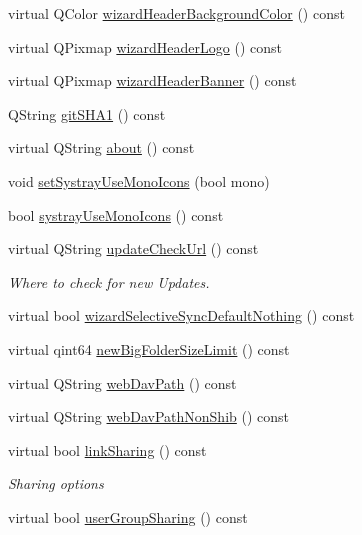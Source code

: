 \begin{DoxyCompactItemize}
\item 
virtual Q\+Color \hyperlink{class_o_c_c_1_1_theme_a65e6b8932baedf7b63b61d0fd5bc5420}{wizard\+Header\+Background\+Color} () const
\item 
virtual Q\+Pixmap \hyperlink{class_o_c_c_1_1_theme_a6263d9c402834d60ce0fd6ee71b5cbbe}{wizard\+Header\+Logo} () const
\item 
virtual Q\+Pixmap \hyperlink{class_o_c_c_1_1_theme_a19c482f0c9757f8f16aa7f1bb17f26a7}{wizard\+Header\+Banner} () const
\item 
Q\+String \hyperlink{class_o_c_c_1_1_theme_a2775c2774c9b250275ad0f43d84dfcd6}{git\+S\+H\+A1} () const
\item 
virtual Q\+String \hyperlink{class_o_c_c_1_1_theme_a0fb376868cffa1e0fab810c9f9b9c4e5}{about} () const
\item 
void \hyperlink{class_o_c_c_1_1_theme_a23ba7145a5574adbe27d163c95e2e82b}{set\+Systray\+Use\+Mono\+Icons} (bool mono)
\item 
bool \hyperlink{class_o_c_c_1_1_theme_ad78da2daf0f820d80720fa977a91448e}{systray\+Use\+Mono\+Icons} () const
\item 
virtual Q\+String \hyperlink{class_o_c_c_1_1_theme_a3c27a3a46ea0fc7e6569d467d403c76f}{update\+Check\+Url} () const
\begin{DoxyCompactList}\small\item\em Where to check for new Updates. \end{DoxyCompactList}\item 
virtual bool \hyperlink{class_o_c_c_1_1_theme_ab07bddac0c6491210c81ec4d8f132f73}{wizard\+Selective\+Sync\+Default\+Nothing} () const
\item 
virtual qint64 \hyperlink{class_o_c_c_1_1_theme_afcf3b20ca4685097b7ada76c6a7cf2ec}{new\+Big\+Folder\+Size\+Limit} () const
\item 
virtual Q\+String \hyperlink{class_o_c_c_1_1_theme_ac31242fa479e2b15711ea5d3cd9df363}{web\+Dav\+Path} () const
\item 
virtual Q\+String \hyperlink{class_o_c_c_1_1_theme_a612f8d248692a32c295009c68fd670c5}{web\+Dav\+Path\+Non\+Shib} () const
\item 
virtual bool \hyperlink{class_o_c_c_1_1_theme_a4860bc1081f2e9c0ea8c1ad02be80927}{link\+Sharing} () const
\begin{DoxyCompactList}\small\item\em Sharing options \end{DoxyCompactList}\item 
virtual bool \hyperlink{class_o_c_c_1_1_theme_a8ffc69e13d525977ec8ab272ecaba96c}{user\+Group\+Sharing} () const

\end{DoxyCompactItemize}
